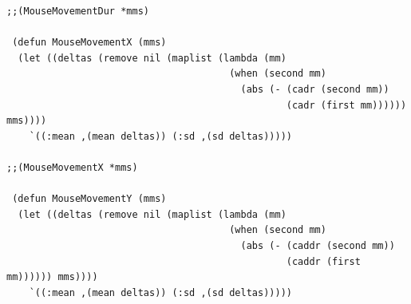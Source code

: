 \begin{lstlisting}[frame=single]
;;(MouseMovementDur *mms)

 (defun MouseMovementX (mms)
  (let ((deltas (remove nil (maplist (lambda (mm)
                                       (when (second mm)
                                         (abs (- (cadr (second mm))
                                                 (cadr (first mm)))))) mms))))
    `((:mean ,(mean deltas)) (:sd ,(sd deltas)))))

;;(MouseMovementX *mms)

 (defun MouseMovementY (mms)
  (let ((deltas (remove nil (maplist (lambda (mm)
                                       (when (second mm)
                                         (abs (- (caddr (second mm))
                                                 (caddr (first mm)))))) mms))))
    `((:mean ,(mean deltas)) (:sd ,(sd deltas)))))

\end{lstlisting}





